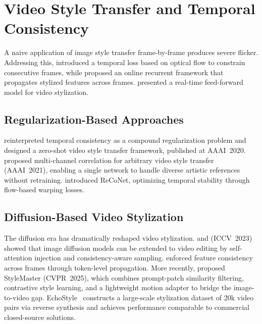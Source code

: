 \section{Video Style Transfer and Temporal Consistency}
\label{sec:video}

A naive application of image style transfer frame-by-frame produces severe flicker.
Addressing this, \citet{ruder2016artistic} introduced a temporal loss based on optical
flow to constrain consecutive frames, while \citet{chen2017coherent} proposed an online
recurrent framework that propagates stylized features across frames.
\citet{huang2017realtime} presented a real-time feed-forward model for video stylization.

\subsection{Regularization-Based Approaches}

\citet{wang2020consistent} reinterpreted temporal consistency as a compound
regularization problem and designed a zero-shot video style transfer framework,
published at AAAI~2020. \citet{deng2021arbitrary} proposed multi-channel correlation for
arbitrary video style transfer (AAAI~2021), enabling a single network to handle diverse
artistic references without retraining. \citet{gao2020reconet} introduced ReCoNet,
optimizing temporal stability through flow-based warping losses.

\subsection{Diffusion-Based Video Stylization}

The diffusion era has dramatically reshaped video stylization. \citet{ceylan2023pix2video}
and \citet{chai2023stablevideo} (ICCV~2023) showed that image diffusion models can be
extended to video editing by self-attention injection and consistency-aware sampling.
\citet{geyer2023tokenflow} enforced feature consistency across frames through token-level
propagation. More recently, \citet{ye2025stylemaster} proposed StyleMaster (CVPR~2025),
which combines prompt-patch similarity filtering, contrastive style learning, and a
lightweight motion adapter to bridge the image-to-video gap. EchoStyle~\cite{li2026echostyle}
constructs a large-scale stylization dataset of 20k video pairs via reverse synthesis and
achieves performance comparable to commercial closed-source solutions.
